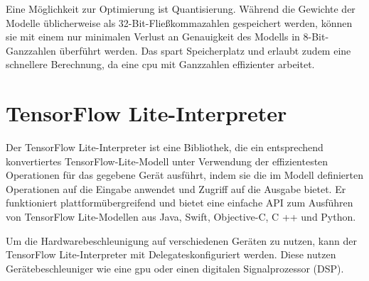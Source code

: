 Eine Möglichkeit zur Optimierung ist Quantisierung. Während die Gewichte der Modelle üblicherweise als 32-Bit-Fließkommazahlen gespeichert werden, können sie mit einem nur minimalen Verlust an Genauigkeit des Modells in 8-Bit-Ganzzahlen überführt werden. Das spart Speicherplatz und erlaubt zudem eine schnellere Berechnung, da eine \ac{cpu} mit Ganzzahlen effizienter arbeitet. \cite{Warden:2020}

\section{TensorFlow Lite-Interpreter}

Der TensorFlow Lite-Interpreter ist eine Bibliothek, die ein entsprechend konvertiertes TensorFlow-Lite-Modell unter Verwendung der effizientesten Operationen für das gegebene Gerät ausführt, indem sie die im Modell definierten Operationen auf die Eingabe anwendet und Zugriff auf die Ausgabe bietet. Er funktioniert plattformübergreifend und bietet eine einfache API zum Ausführen von TensorFlow Lite-Modellen aus Java, Swift, Objective-C, C ++ und Python.\cite{Google.09.10.2020}\cite{Warden:2020}

Um die Hardwarebeschleunigung auf verschiedenen Geräten zu nutzen, kann der TensorFlow Lite-Interpreter mit \glqq Delegates\grqq konfiguriert werden. Diese nutzen Gerätebeschleuniger wie eine \ac{gpu} oder einen digitalen Signalprozessor (DSP). \cite{Google.09.10.2020}

